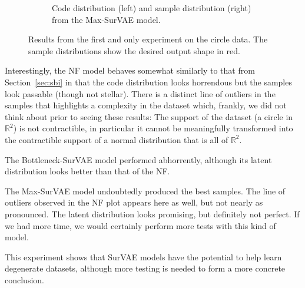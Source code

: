 \begin{figure}
\begin{subfigure}{\textwidth}
    \caption{Code distribution (left) and sample distribution (right) from the Max-SurVAE model.}
\end{subfigure}
\caption{Results from the first and only experiment on the circle data. The sample distributions show the desired output shape in red.}
\label{fig:circle_results}
\end{figure}

Interestingly, the NF model behaves somewhat similarly to that from Section~\ref{sec:sbi} in that the code distribution looks horrendous but the samples look passable (though not stellar). There is a distinct line of outliers in the samples that highlights a complexity in the dataset which, frankly, we did not think about prior to seeing these results: The support of the dataset (a circle in $\mathbb{R}^2$) is not contractible, in particular it cannot be meaningfully transformed into the contractible support of a normal distribution that is all of $\mathbb{R}^2$.

The Bottleneck-SurVAE model performed abhorrently, although its latent distribution looks better than that of the NF.

The Max-SurVAE model undoubtedly produced the best samples. The line of outliers observed in the NF plot appears here as well, but not nearly as pronounced. The latent distribution looks promising, but definitely not perfect. If we had more time, we would certainly perform more tests with this kind of model.

This experiment shows that SurVAE models have the potential to help learn degenerate datasets, although more testing is needed to form a more concrete conclusion.